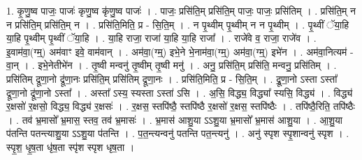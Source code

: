 \documentclass[17pt]{extarticle}
\begin{document}
1. कृ॒णु॒ष्व पाजः॒ पाजः॑ कृणु॒ष्व कृ॑णु॒ष्व पाजः॑ । . पाजः॒ प्रसि॑ति॒म् प्रसि॑ति॒म् पाजः॒ पाजः॒ प्रसि॑तिम् । . प्रसि॑ति॒म् न न प्रसि॑ति॒म् प्रसि॑ति॒म् न । . प्रसि॑ति॒मिति॒ प्र - सि॒ति॒म् । . न पृ॒थ्वीम् पृ॒थ्वीम् न न पृ॒थ्वीम् । . पृ॒थ्वीं ॅया॒हि या॒हि पृ॒थ्वीम् पृ॒थ्वीं ॅया॒हि । . या॒हि राजा॒ राजा॑ या॒हि या॒हि राजा᳚ । . राजे॑वे व॒ राजा॒ राजे॑व । . इ॒वाम॑वा॒(ग्म्॒) अम॑वाꣳ इवे॒ वाम॑वान् । . अम॑वा॒(ग्म्॒) इभे॒ने भे॒नाम॑वा॒(ग्म्॒) अम॑वा॒(ग्म्॒) इभे॑न । . अम॑वा॒नित्यम॑ - वा॒न् । . इभे॒नेतीभे॑न । . तृ॒ष्वी मन्वनु॑ तृ॒ष्वीम् तृ॒ष्वी मनु॑ । . अनु॒ प्रसि॑ति॒म् प्रसि॑ति॒ मन्वनु॒ प्रसि॑तिम् । . प्रसि॑तिम् द्रूणा॒नो द्रू॑णा॒नः प्रसि॑ति॒म् प्रसि॑तिम् द्रूणा॒नः । . प्रसि॑ति॒मिति॒ प्र - सि॒ति॒म् । . द्रू॒णा॒नो ऽस्ता ऽस्ता᳚ द्रूणा॒नो द्रू॑णा॒नो ऽस्ता᳚ । . अस्ता᳚ ऽस्य॒ स्यस्ता ऽस्ता॑ ऽसि । . अ॒सि॒ विद्ध्य॒ विद्ध्या᳚ स्यसि॒ विद्ध्य॑ । . विद्ध्य॑ र॒क्षसो॑ र॒क्षसो॒ विद्ध्य॒ विद्ध्य॑ र॒क्षसः॑ । . र॒क्षस॒ स्तपि॑ष्ठै॒ स्तपि॑ष्ठै र॒क्षसो॑ र॒क्षस॒ स्तपि॑ष्ठैः । . तपि॑ष्ठै॒रिति॒ तपि॑ष्ठैः । . तव॑ भ्र॒मासो᳚ भ्र॒मास॒ स्तव॒ तव॑ भ्र॒मासः॑ । . भ्र॒मास॑ आशु॒या ऽऽशु॒या भ्र॒मासो᳚ भ्र॒मास॑ आशु॒या । . आ॒शु॒या प॑तन्ति पतन्त्याशु॒या ऽऽशु॒या प॑तन्ति । . प॒त॒न्त्यन्वनु॑ पतन्ति पत॒न्त्यनु॑ । . अनु॑ स्पृश स्पृ॒शान्वनु॑ स्पृश । . स्पृ॒श॒ धृ॒ष॒ता धृ॑ष॒ता स्पृ॑श स्पृश धृष॒ता । \newline
\end{document}
